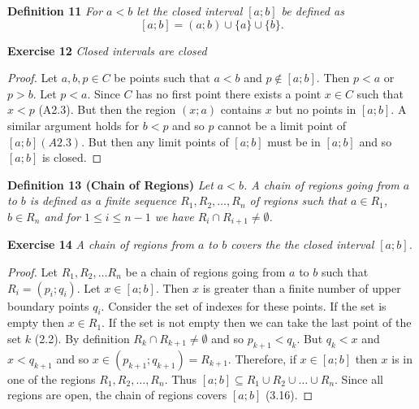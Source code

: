 \documentclass{article}
\begin{document}
\begin{flushleft}
\textbf{Definition 11}
\textsl{For $a<b$ let the closed interval $[a;b]$ be defined as
\[
[a;b] = (a;b) \cup \{a\} \cup \{b\}.
\]}\newline

\textbf{Exercise 12}
\textsl{Closed intervals are closed}
\begin{proof}
Let $a,b,p \in C$ be points such that $a<b$ and $p \notin [a;b]$. Then $p<a$ or $p>b$. Let $p<a$. Since $C$ has no first point there exists a point $x \in C$ such that $x<p$ (A2.3). But then the region $(x;a)$ contains $x$ but no points in $[a;b]$. A similar argument holds for $b<p$ and so $p$ cannot be a limit point of $[a;b] (A2.3)$. But then any limit points of $[a;b]$ must be in $[a;b]$ and so $[a;b]$ is closed.
\end{proof}

\textbf{Definition 13 (Chain of Regions)}
\textsl{Let $a<b$. A chain of regions going from $a$ to $b$ is defined as a finite sequence $R_1, R_2, \dots ,R_n$ of regions such that $a \in R_1$, $b \in R_n$ and for $1 \leq i \leq n-1$ we have $R_i \cap R_{i+1} \neq \emptyset$.}\newline

\textbf{Exercise 14}
\textsl{A chain of regions from $a$ to $b$ covers the the closed interval $[a;b]$.}
\begin{proof}
Let $R_1,R_2, \dots R_n$ be a chain of regions going from $a$ to $b$ such that $R_i=(p_i;q_i)$. Let $x \in [a;b]$. Then $x$ is greater than a finite number of upper boundary points $q_i$. Consider the set of indexes for these points. If the set is empty then $x \in R_1$. If the set is not empty then we can take the last point of the set $k$ (2.2). By definition $R_k \cap R_{k+1} \neq \emptyset$ and so $p_{k+1} < q_k$. But $q_k<x$ and $x<q_{k+1}$ and so $x \in (p_{k+1};q_{k+1})=R_{k+1}$. Therefore, if $x \in [a;b]$ then $x$ is in one of the regions $R_1,R_2, \dots ,R_n$. Thus $[a;b] \subseteq R_1 \cup R_2 \cup \dots \cup R_n$. Since all regions are open, the chain of regions covers $[a;b]$ (3.16).
\end{proof}


\end{flushleft}
\end{document}
